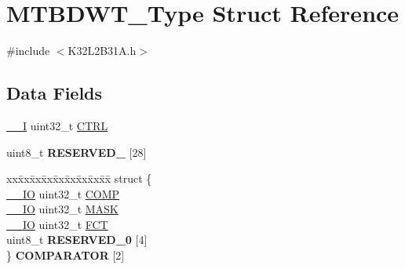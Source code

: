 \hypertarget{struct_m_t_b_d_w_t___type}{}\section{M\+T\+B\+D\+W\+T\+\_\+\+Type Struct Reference}
\label{struct_m_t_b_d_w_t___type}


{\ttfamily \#include $<$K32\+L2\+B31\+A.\+h$>$}

\subsection*{Data Fields}
\begin{DoxyCompactItemize}
\item 
\mbox{\hyperlink{core__cm0plus_8h_af63697ed9952cc71e1225efe205f6cd3}{\+\_\+\+\_\+I}} uint32\+\_\+t \mbox{\hyperlink{struct_m_t_b_d_w_t___type_a9549c4cef02a58746721348d670e4672}{C\+T\+RL}}
\item 
\mbox{\label{struct_m_t_b_d_w_t___type_ac8c74521f9046fb165e5340648fde167}} 
uint8\+\_\+t {\bfseries R\+E\+S\+E\+R\+V\+E\+D\+\_} \mbox{[}28\mbox{]}
\item 
\mbox{\label{struct_m_t_b_d_w_t___type_a36d89e7985c7f5e05d83bbaba5694dd6}} 
\begin{tabbing}
xx\=xx\=xx\=xx\=xx\=xx\=xx\=xx\=xx\=\kill
struct \{\\
\>\mbox{\hyperlink{core__cm0plus_8h_aec43007d9998a0a0e01faede4133d6be}{\_\_IO}} uint32\_t \mbox{\hyperlink{struct_m_t_b_d_w_t___type_a0c446648987aaee5bb2cd7c8a2e95519}{COMP}}\\
\>\mbox{\hyperlink{core__cm0plus_8h_aec43007d9998a0a0e01faede4133d6be}{\_\_IO}} uint32\_t \mbox{\hyperlink{struct_m_t_b_d_w_t___type_a5c955643593b4aedbe9f84f054d26522}{MASK}}\\
\>\mbox{\hyperlink{core__cm0plus_8h_aec43007d9998a0a0e01faede4133d6be}{\_\_IO}} uint32\_t \mbox{\hyperlink{struct_m_t_b_d_w_t___type_afd5a884a462a6723edaced63ba23ba4e}{FCT}}\\
\>uint8\_t {\bfseries RESERVED\_0} \mbox{[}4\mbox{]}\\
\} {\bfseries COMPARATOR} \mbox{[}2\mbox{]}\\


\end{tabbing}
\end{DoxyCompactItemize}

